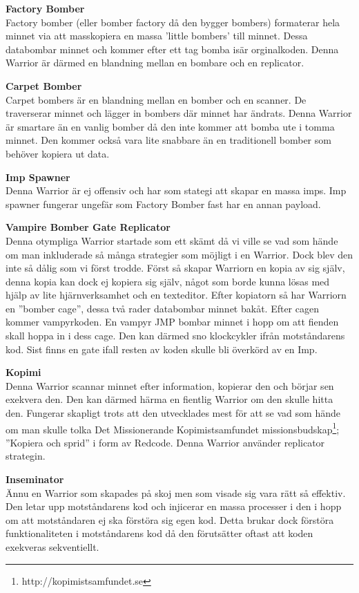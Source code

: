 \documentclass[11pt]{article}
\begin{document}
\textbf{Factory Bomber} \\
Factory bomber (eller bomber factory då den bygger bombers) formaterar hela minnet via att masskopiera en massa ’little bombers’ till minnet. Dessa databombar minnet och kommer efter ett tag bomba isär orginalkoden. Denna Warrior är därmed en blandning mellan en bombare och en replicator.

\textbf{Carpet Bomber} \\
Carpet bombers är en blandning mellan en bomber och en scanner. De traverserar minnet och lägger in bombers där minnet har ändrats. Denna Warrior är smartare än en vanlig bomber då den inte kommer att bomba ute i tomma minnet. Den kommer också vara lite snabbare än en traditionell bomber som behöver kopiera ut data.

\textbf{Imp Spawner} \\
Denna Warrior är ej offensiv och har som stategi att skapar en massa imps. Imp spawner fungerar ungefär som Factory Bomber fast har en annan payload.

\textbf{Vampire Bomber Gate Replicator} \\
Denna otympliga Warrior startade som ett skämt då vi ville se vad som hände om man inkluderade så många strategier som möjligt i en Warrior. Dock blev den inte så dålig som vi först trodde. Först så skapar Warriorn en kopia av sig själv, denna kopia kan dock ej kopiera sig själv, något som borde kunna lösas med hjälp av lite hjärnverksamhet och en texteditor. Efter kopiatorn så har Warriorn en ”bomber cage”, dessa två rader databombar minnet bakåt. Efter cagen kommer vampyrkoden. En vampyr JMP bombar minnet i hopp om att fienden skall hoppa in i dess cage. Den kan därmed sno klockcykler ifrån motståndarens kod. Sist finns en gate ifall resten av koden skulle bli överkörd av en Imp.

\textbf{Kopimi} \\
Denna Warrior scannar minnet efter information, kopierar den och börjar sen exekvera den. Den kan därmed härma en fientlig Warrior om den skulle hitta den. Fungerar skapligt trots att den utvecklades mest för att se vad som hände om man skulle tolka Det Missionerande Kopimistsamfundet missionsbudskap\footnote{http://kopimistsamfundet.se}; ”Kopiera och sprid” i form av Redcode. Denna Warrior använder replicator strategin.

\textbf{Inseminator} \\
Ännu en Warrior som skapades på skoj men som visade sig vara rätt så effektiv. Den letar upp motståndarens kod och injicerar en massa processer i den i hopp om att motståndaren ej ska förstöra sig egen kod. Detta brukar dock förstöra funktionaliteten i motståndarens kod då den förutsätter oftast att koden exekveras sekventiellt.
\end{document}
